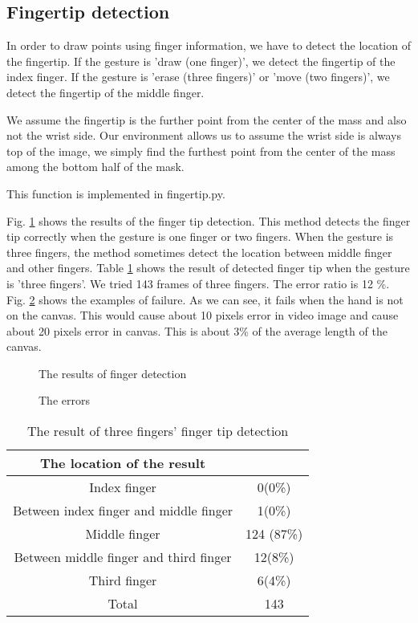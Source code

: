 \subsection{Fingertip detection}
In order to draw points using finger information, we have to detect the location of the fingertip.
If the gesture is 'draw (one finger)', we detect the fingertip of the index finger. 
If the gesture is 'erase (three fingers)' or 'move (two fingers)', we detect the fingertip of the middle finger. \par
We assume the fingertip is the further point from the center of the mass and also not the wrist side.
Our environment allows us to assume the wrist side is always top of the image, we simply find the furthest point from the center of the mass among the bottom half of the mask.

This function is implemented in fingertip.py. 

Fig. \ref{fig:finger} shows the results of the finger tip detection.
This method detects the finger tip correctly when the gesture is one finger or two fingers.
When the gesture is three fingers, the method sometimes detect the location between middle finger and other fingers.
Table \ref{tb:finger} shows the result of detected finger tip when the gesture is 'three fingers'.
We tried 143 frames of three fingers.
The error ratio is 12 \%. Fig. \ref{fig:errorfinger} shows the examples of failure. As we can see, it fails when the hand is not on the canvas. This would cause about 10 pixels error in video image and cause about 20 pixels error in canvas. This is about 3\% of the average length of the canvas.

\begin{figure}[htbp]
 \centering
 
 \caption{The results of finger detection}
\label{fig:finger}
\end{figure}

\begin{figure}[htbp]
 \centering
 
 \caption{The errors}
\label{fig:errorfinger}
\end{figure}

\begin{table}
 \caption{The result of three fingers' finger tip detection}
 \label{tb:finger}
 \begin{tabular}{|c|c|}
 \hline
 The location of the result &  \\ \hline
 Index finger & 0(0\%) \\ \hline
 Between index finger and middle finger & 1(0\%) \\ \hline
 Middle finger & 124 (87\%) \\ \hline
 Between middle finger and third finger & 12(8\%) \\ \hline
 Third finger & 6(4\%) \\ \hline
 Total & 143 \\ \hline
 \end{tabular}
\end{table}
